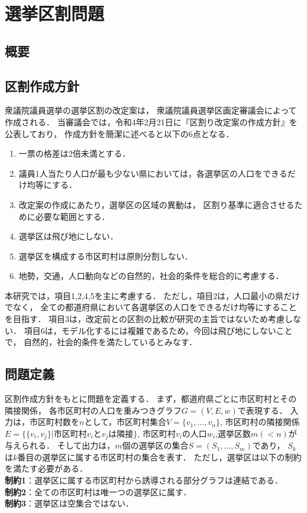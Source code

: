 \chapter{選挙区割問題} \label{chapter:2}

\section{概要}


\section{区割作成方針}
衆議院議員選挙の選挙区割の改定案は，
衆議院議員選挙区画定審議会によって作成される．
当審議会では，令和4年2月21日に『区割り改定案の作成方針』を公表しており，
作成方針を簡潔に述べると以下の6点となる．
\begin{enumerate}
    \item 一票の格差は2倍未満とする．
    \item 議員1人当たり人口が最も少ない県においては，各選挙区の人口をできるだけ均等にする．
    \item 改定案の作成にあたり，選挙区の区域の異動は，
    区割り基準に適合させるために必要な範囲とする．
    \item 選挙区は飛び地にしない．
    \item 選挙区を構成する市区町村は原則分割しない．
    \item 地勢，交通，人口動向などの自然的，社会的条件を総合的に考慮する．
\end{enumerate}

本研究では，項目1,2,4,5を主に考慮する．
ただし，項目2は，人口最小の県だけでなく，
全ての都道府県において各選挙区の人口をできるだけ均等にすることを目指す．
項目3は，改定前との区割の比較が研究の主旨ではないため考慮しない．
項目6は，モデル化するには複雑であるため，今回は飛び地にしないことで，
自然的，社会的条件を満たしているとみなす．

\section{問題定義}

区割作成方針をもとに問題を定義する．
まず，都道府県ごとに市区町村とその隣接関係，
各市区町村の人口を重みつきグラフ$G=(V, E, w)$で表現する．
入力は，市区町村数を$n$として，市区町村集合$V=\{v_1,...,v_n\}$, 
市区町村の隣接関係$E=\{\{v_i,v_j\}|$市区町村$v_i$と$v_j$は隣接$\}$, 
市区町村$v_i$の人口$w_i$,選挙区数$m(<n)$が与えられる．
そして出力は，$m$個の選挙区の集合$S=(S_1,...,S_m)$であり，
$S_k$は$k$番目の選挙区に属する市区町村の集合を表す．
ただし，選挙区は以下の制約を満たす必要がある．\\
\quad\textbf{制約1}：選挙区に属する市区町村から誘導される部分グラフは連結である．\\
\quad\textbf{制約2}：全ての市区町村は唯一つの選挙区に属す．\\
\quad\textbf{制約3}：選挙区は空集合ではない．

